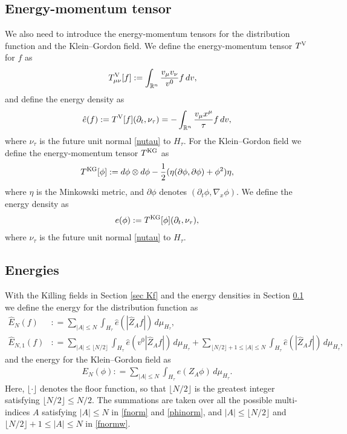 \documentclass{article}
\newcommand{\bbr}{{\mathbb R}}
\newcommand{\rV}{{\rm V}}
\newcommand{\rK}{{\rm KG}}
\begin{document}
\subsection{Energy-momentum tensor} \label{sec em}
We also need to introduce the energy-momentum tensors for the distribution function and the Klein--Gordon field. We define the energy-momentum tensor $ T^\rV $ for $ f $ as
\begin{align*}
& T^\rV_{ \mu \nu } [ f ] : = \int_{ \bbr^n } \frac{ v_\mu v_\nu }{ v^0 } f \, d v ,
\end{align*}
and define the energy density as
\begin{align*}
\hat{ e } ( f ) : = T^\rV [ f ] ( \partial_t , \nu_\tau ) = - \int_{ \bbr^n } \frac{ v_\mu x^\mu }{ \tau } f \, d v ,
\end{align*}
where $ \nu_\tau $ is the future unit normal \eqref{nutau} to $ H_\tau $. For the Klein--Gordon field we define the energy-momentum tensor $ T^\rK $ as
\begin{align*}
T^\rK [ \phi ] : = d \phi \otimes d \phi - \frac12 ( \eta ( \partial \phi , \partial \phi ) + \phi^2 ) \eta ,
\end{align*}
where $ \eta $ is the Minkowski metric, and $ \partial \phi $ denotes $ ( \partial_t \phi , \nabla_x \phi ) $. We define the energy density as
\begin{align*}
e  ( \phi ) : = T^\rK [ \phi ] ( \partial_t , \nu_\tau ) ,
\end{align*}
where $ \nu_\tau $ is the future unit normal \eqref{nutau} to $ H_\tau $. 





%
\subsection{Energies} \label{sec e}
With the Killing fields in Section \ref{sec Kf} and the energy densities in Section \ref{sec em} we define the energy for the distribution function as
\begin{align}
\hat{ E }_N ( f ) & : = \sum_{ | A | \leq N } \int_{ H_\tau }  \hat{ e } ( | \hat{ Z }_A f | ) \, d \mu_{ H_\tau } , \label{fnorm} \\
\hat{ E }_{ N , 1 } ( f ) & : = \sum_{ | A | \leq \lfloor N / 2 \rfloor } \int_{ H_\tau } \hat{ e } ( v^0 | \hat{ Z }_A f | ) \, d \mu_{ H_\tau } + \sum_{ \lfloor N / 2 \rfloor + 1 \leq | A | \leq N } \int_{ H_\tau } \hat{ e } ( | \hat{ Z }_A f | ) \, d \mu_{ H_\tau } , \label{fnormw}
\end{align}
and the energy for the Klein--Gordon field as
\begin{align}
E_N ( \phi ) : = \sum_{ | A | \leq N } \int_{ H_\tau } e ( Z_A \phi ) \, d \mu_{ H_\tau } . \label{phinorm}
\end{align}
Here, $ \lfloor \cdot \rfloor $ denotes the floor function, so that $ \lfloor N / 2 \rfloor $ is the greatest integer satisfying $ \lfloor N / 2 \rfloor \leq N / 2 $. The summations are taken over all the possible multi-indices $ A $ satisfying $ | A | \leq N $ in \eqref{fnorm} and \eqref{phinorm}, and $ | A | \leq \lfloor N / 2 \rfloor $ and $ \lfloor N / 2 \rfloor + 1 \leq | A | \leq N $ in \eqref{fnormw}.
\end{document}
